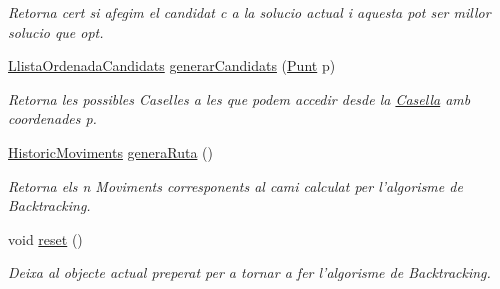 \begin{DoxyCompactItemize}
\begin{DoxyCompactList}\small\item\em Retorna cert si afegim el candidat c a la solucio actual i aquesta pot ser millor solucio que opt. \end{DoxyCompactList}\item 
\hyperlink{classlogica_1_1algoritmica_1_1_llista_ordenada_candidats}{Llista\+Ordenada\+Candidats} \hyperlink{classlogica_1_1algoritmica_1_1_back_tracking_1_1_solucio_a75cbbd1737092ae156d31d27f6a9744f}{generar\+Candidats} (\hyperlink{classlogica_1_1_punt}{Punt} p)
\begin{DoxyCompactList}\small\item\em Retorna les possibles Caselles a les que podem accedir desde la \hyperlink{classlogica_1_1algoritmica_1_1_casella}{Casella} amb coordenades p. \end{DoxyCompactList}\item 
\hyperlink{classlogica_1_1historic__moviments_1_1_historic_moviments}{Historic\+Moviments} \hyperlink{classlogica_1_1algoritmica_1_1_back_tracking_1_1_solucio_ad92451e3b29a2d5918053827e2996ba8}{genera\+Ruta} ()
\begin{DoxyCompactList}\small\item\em Retorna els n Moviments corresponents al cami calculat per l'algorisme de Backtracking. \end{DoxyCompactList}\item 
void \hyperlink{classlogica_1_1algoritmica_1_1_back_tracking_1_1_solucio_ac695cbcd0dc5a3d5e9da492244718681}{reset} ()
\begin{DoxyCompactList}\small\item\em Deixa al objecte actual preperat per a tornar a fer l'algorisme de Backtracking. \end{DoxyCompactList}\end{DoxyCompactItemize}
